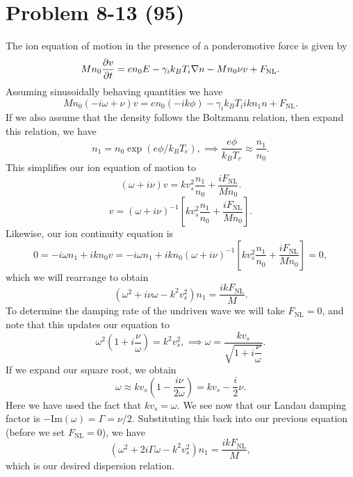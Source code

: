 \section*{Problem 8-13 (95)}
\label{sec:8-13}
The ion equation of motion in the presence of a ponderomotive force is given by
\begin{equation*}
	Mn_0\frac{\partial v}{\partial t} = en_0E - \gamma_ik_BT_i\nabla n - Mn_0\nu v + F_\text{NL}.
\end{equation*}
Assuming sinusoidally behaving quantities we have
\begin{equation*}
Mn_0(-i\omega + \nu)v = en_0(-ik\phi) - \gamma_ik_BT_iikn_1 n + F_\text{NL}.
\end{equation*}
If we also assume that the density follows the Boltzmann relation, then expand this relation, we have
\begin{equation*}
	n_1 = n_0\exp(e\phi/k_BT_e), \implies \dfrac{e\phi}{k_BT_e} \approx \dfrac{n_1}{n_0}.
\end{equation*}
This simplifies our ion equation of motion to
\begin{equation*}
	(\omega + i\nu)v = kv_s^2\dfrac{n_1}{n_0} + \dfrac{iF_\text{NL}}{Mn_0}.
\end{equation*}
\begin{equation*}
	v = (\omega + i\nu)^{-1}\left[kv_s^2\dfrac{n_1}{n_0} + \dfrac{iF_\text{NL}}{Mn_0}\right].
\end{equation*}
Likewise, our ion continuity equation is
\begin{equation*}
	0 = -i\omega n_1 + ikn_0 v = -i\omega n_1 + ikn_0(\omega + i\nu)^{-1}\left[kv_s^2\dfrac{n_1}{n_0} + \dfrac{iF_\text{NL}}{Mn_0} \right] = 0,
\end{equation*}
which we will rearrange to obtain
\begin{equation*}
	\left(\omega^2 + i\nu\omega - k^2v_s^2 \right)n_1 = \dfrac{ikF_\text{NL}}{M}.
\end{equation*}
To determine the damping rate of the undriven wave we will take \(F_\text{NL} = 0\), and note that this updates our equation to
\begin{equation*}
	\omega^2\left(1 + i\dfrac{\nu}{\omega} \right) = k^2v_s^2, \implies \omega = \dfrac{kv_s}{\sqrt{1 + i\dfrac{\nu}{\omega}}}.
\end{equation*}
If we expand our square root, we obtain
\begin{equation*}
	\omega \approx kv_s\left(1 - \dfrac{i\nu}{2\omega} \right) = kv_s - \dfrac{i}{2}\nu.
\end{equation*}
Here we have used the fact that \(kv_s = \omega \). We see now that our Landau damping factor is \(-\text{Im}(\omega) = \Gamma = \nu/2 \). Substituting this back into our previous equation (before we set \(F_\text{NL} = 0 \)), we have
\begin{equation*}
	\left(\omega^2 + 2i\Gamma\omega - k^2v_s^2 \right)n_1 = \dfrac{ikF_\text{NL}}{M},
\end{equation*}
which is our desired dispersion relation. 


